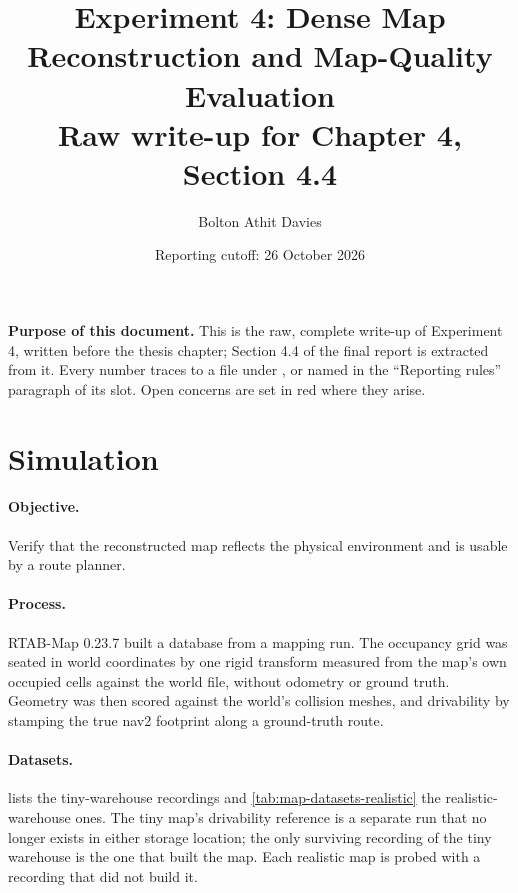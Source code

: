 \documentclass[11pt,a4paper,notitlepage]{report}
\title{Experiment 4: Dense Map Reconstruction and Map-Quality Evaluation\\
       \large Raw write-up for Chapter 4, Section 4.4}
\author{Bolton Athit Davies}
\date{Reporting cutoff: 26 October 2026}
\begin{document}
\maketitle

\noindent\textbf{Purpose of this document.} This is the raw, complete write-up
of Experiment 4, written before the thesis chapter; Section 4.4 of the final
report is extracted from it. Every number traces to a file under ,
 or  named in the ``Reporting rules'' paragraph of its
slot. Open concerns are set in red where they arise.

\section{Simulation}
\label{sec:map-sim}


\paragraph{Objective.} Verify that the reconstructed map reflects the physical
environment and is usable by a route planner.

\paragraph{Process.} RTAB-Map 0.23.7 built a database from a mapping run. The
occupancy grid was seated in world coordinates by one rigid transform measured
from the map's own occupied cells against the world file, without odometry or
ground truth. Geometry was then scored against the world's collision meshes, and
drivability by stamping the true nav2 footprint along a ground-truth route.

\paragraph{Datasets.}  lists the tiny-warehouse
recordings and \cref{tab:map-datasets-realistic} the realistic-warehouse ones.
The tiny map's drivability reference is a separate run that no longer exists in
either storage location; the only surviving recording of the tiny warehouse is
the one that built the map. Each realistic map is probed with a recording that
did not build it.
\end{document}
